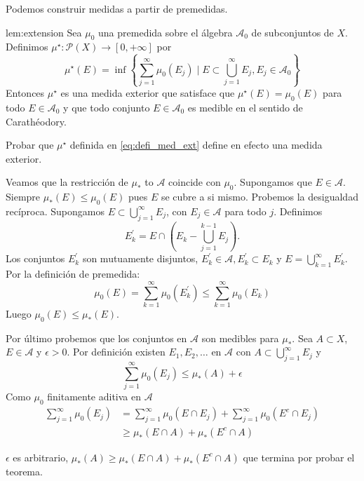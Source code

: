 Podemos construir medidas a partir de premedidas.

\begin{lema}{lem:extension}
 Sea $\mu_0$ una premedida sobre el álgebra  $\mathscr{A}_0$ de subconjuntos de $X$. Definimos  $\mu^\star:\mathcal{P}(X)\to [0,+\infty]$ por
 \begin{equation}\label{eq:defi_med_ext}
  \mu^\star(E)=\inf\left\{ \sum\limits_{j=1}^{\infty}\mu_0(E_j)\mid E\subset \bigcup\limits_{j=1}^{\infty}E_j, E_j\in\mathcal{A}_0  \right\}
 \end{equation}
 Entonces $\mu^\star$ es una medida exterior que satisface que $\mu^\star(E)=\mu_0(E)$ para todo $E\in\mathcal{A}_0$ y que todo conjunto 
$E\in\mathcal{A}_0$ es medible en el sentido de Carathéodory. 
\end{lema}

 \begin{demo} 
  


\begin{ejercicio}{} Probar que $\mu^\star$ definida en \eqref{eq:defi_med_ext} define en efecto una medida exterior.
 
\end{ejercicio}

Veamos que la restricción de $\mu_{*}$ to $\mathcal{A}$ coincide con $\mu_{0}$. Supongamos que $E \in \mathcal{A}$. Siempre $\mu_{*}(E) \leq \mu_{0}(E)$ pues $E$ se cubre a si mismo. Probemos la desigualdad recíproca. Supongamos  $E \subset \bigcup_{j=1}^{\infty} E_{j}$, con $E_{j} \in \mathcal{A}$ para todo $j$. Definimos
$$
E_{k}^{\prime}=E \cap\left(E_{k}-\bigcup_{j=1}^{k-1} E_{j}\right)
.$$
Los conjuntos $E_{k}^{\prime}$ son mutuamente disjuntos, $E_{k}^{\prime}\in \mathcal{A}, E_{k}^{\prime} \subset E_{k}$ y $E=\bigcup\limits_{k=1}^{\infty} E_{k}^{\prime}$. Por la definición de premedida:
$$
\mu_{0}(E)=\sum_{k=1}^{\infty} \mu_{0}\left(E_{k}^{\prime}\right) \leq \sum_{k=1}^{\infty} \mu_{0}\left(E_{k}\right)
$$
Luego  $\mu_{0}(E) \leq \mu_{*}(E)$.

Por último probemos que los conjuntos en $\mathcal{A}$ son medibles para $\mu_{*}$. Sea $A\subset X$, $E \in \mathcal{A}$ y $\epsilon>0$. Por definición existen  $E_{1}, E_{2}, \ldots$ en $\mathcal{A}$ con $A \subset \bigcup\limits_{j=1}^{\infty} E_{j}$ y
$$
\sum\limits_{j=1}^{\infty} \mu_{0}\left(E_{j}\right) \leq \mu_{*}(A)+\epsilon
$$
Como $\mu_{0}$  finitamente  aditiva en $\mathcal{A}$ 
$$
\begin{aligned}
\sum_{j=1}^{\infty} \mu_{0}\left(E_{j}\right) &=\sum_{j=1}^{\infty} \mu_{0}\left(E \cap E_{j}\right)+\sum_{j=1}^{\infty} \mu_{0}\left(E^{c} \cap E_{j}\right) \\
& \geq \mu_{*}(E \cap A)+\mu_{*}\left(E^{c} \cap A\right)
\end{aligned}
$$

$\epsilon$ es arbitrario,  $\mu_{*}(A) \geq \mu_{*}(E \cap A)+\mu_{*}\left(E^{c} \cap A\right)$ que termina por probar el teorema. \end{demo}

